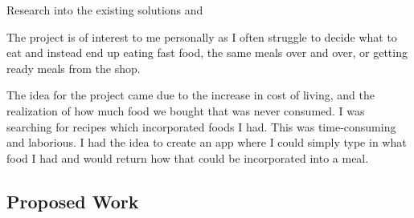 \documentclass[../CHEFCookingHelperForEveryonesFridge.tex]{subfiles}
\renewcommand{\cite}[1]{\parencite{#1}}
\begin{document}
Research into the existing solutions \cite{myfridgefood_myfridgefood_nodate} and \cite{supercook_supercook_nodate}

The project is of interest to me personally as I often struggle to decide what to eat and instead end up eating fast food,
the same meals over and over, or getting ready meals from the shop.

The idea for the project came due to the increase in cost of living, and the realization of how much food we bought that was
never consumed. I was searching for recipes which incorporated foods I had. This was time-consuming and laborious.
I had the idea to create an app where I could simply type in what food I had and would return how that could be incorporated
into a meal.



\subsection{Proposed Work}
\end{document}
